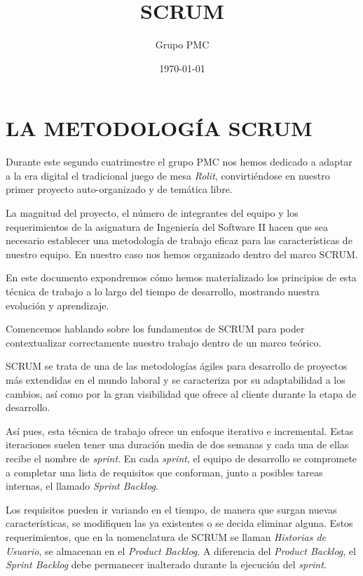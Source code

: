 \documentclass[../DocumentoOficial.tex]{subfiles}
\title{\Huge SCRUM}
\date{\today}
\author{Grupo PMC}
\begin{document}
\maketitle
\setcounter{tocdepth}{3}
\setcounter{secnumdepth}{3}

\chapter{LA METODOLOGÍA SCRUM}\label{scrum_mth}
Durante este segundo cuatrimestre el grupo PMC nos hemos dedicado a adaptar a la era digital el tradicional juego de mesa \textit{Rolit}, convirtiéndose en nuestro primer proyecto auto-organizado y de temática libre.

La magnitud del proyecto, el número de integrantes del equipo y los requerimientos de la asignatura de Ingeniería del Software II hacen que sea necesario establecer una metodología de trabajo eficaz para las características de nuestro equipo. En nuestro caso nos hemos organizado dentro del marco SCRUM.

En este documento expondremos cómo hemos materializado los principios de esta técnica de trabajo a lo largo del tiempo de desarrollo, mostrando nuestra evolución y aprendizaje.

Comencemos hablando sobre los fundamentos de SCRUM para poder contextualizar correctamente nuestro trabajo dentro de un marco teórico.

SCRUM se trata de una de las metodologías ágiles para desarrollo de proyectos más extendidas en el mundo laboral y se caracteriza por su adaptabilidad a los cambios, así como por la gran visibilidad que ofrece al cliente durante la etapa de desarrollo.

Así pues, esta técnica de trabajo ofrece un enfoque iterativo e incremental. Estas iteraciones suelen tener una duración media de dos semanas y cada una de ellas recibe el nombre de \textit{sprint}. En cada \textit{sprint}, el equipo de desarrollo se compromete a completar una lista de requisitos que conforman, junto a posibles tareas internas, el llamado \textit{Sprint Backlog}.

Los requisitos pueden ir variando en el tiempo, de manera que surgan nuevas características, se modifiquen las ya existentes o se decida eliminar alguna. Estos requerimientos, que en la nomenclatura de SCRUM se llaman \textit{Historias de Usuario}, se almacenan en el \textit{Product Backlog}. A diferencia del \textit{Product Backlog}, el \textit{Sprint Backlog} debe permanecer inalterado durante la ejecución del \textit{sprint}.
\end{document}
